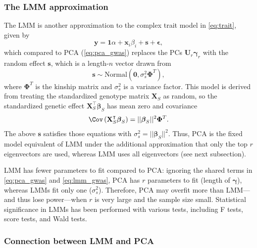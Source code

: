 \documentclass[11pt]{article}
\begin{document}
\subsubsection{The LMM approximation}

The LMM is another approximation to the complex trait model in \cref{eq:trait}, given by
\begin{equation}
  \label{eq:lmm_gwas}
  \mathbf{y}
  =
  \mathbf{1} \alpha + \mathbf{x}_i \beta_i + \mathbf{s} + \boldsymbol{\epsilon}
  ,
\end{equation}
which compared to PCA (\cref{eq:pca_gwas}) replaces the PCs $\mathbf{U}_r \boldsymbol{\gamma}_r$ with the random effect $\mathbf{s}$, which is a length-$n$ vector drawn from \citep{sul_population_2018}
$$
\mathbf{s} \sim \text{Normal} \left( \mathbf{0}, \sigma^2_s \mathbf{\Phi}^T \right),
$$
where $\mathbf{\Phi}^T$ is the kinship matrix and $\sigma^2_s$ is a variance factor.
This model is derived from treating the standardized genotype matrix $\mathbf{X}_S$ as random, so the standardized genetic effect
$\mathbf{X}_S^\intercal \boldsymbol{\beta}_S$
has mean zero and covariance
$$
\Cov \left( \mathbf{X}_S^\intercal \boldsymbol{\beta}_S \right)
=
|| \boldsymbol{\beta}_S ||^2 \mathbf{\Phi}^T
.
$$
The above $\mathbf{s}$ satisfies those equations with $\sigma^2_s = || \boldsymbol{\beta}_S ||^2$.
Thus, PCA is the fixed model equivalent of LMM under the additional approximation that only the top $r$ eigenvectors are used, whereas LMM uses all eigenvectors (see next subsection).

LMM has fewer parameters to fit compared to PCA: ignoring the shared terms in \cref{eq:pca_gwas} and \cref{eq:lmm_gwas}, PCA has $r$ parameters to fit (length of $\boldsymbol{\gamma}$), whereas LMMs fit only one ($\sigma^2_s$).
Therefore, PCA may overfit more than LMM---and thus lose power---when $r$ is very large and the sample size small.
Statistical significance in LMMs has been performed with various tests, including F tests, score tests, and Wald tests.

\subsubsection{Connection between LMM and PCA}
\end{document}
